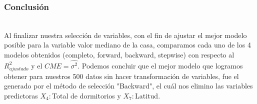 \documentclass[12pt]{beamer}
\begin{document}
\begin{frame}
\frametitle{Conclusión}
~\\ Al finalizar nuestra selección de variables, con el fin de ajustar el mejor modelo posible para la variable valor mediano de la casa, comparamos cada uno de los 4 modelos obtenidos (completo, forward, backward, stepwise) con respecto al $R^2_{ajustado}$ y el $CME=\hat{\sigma^2}$. Podemos concluir que el mejor modelo que logramos obtener  para nuestros 500 datos sin hacer transformación de variables, fue el generado por el método de selección "Backward", el cuál nos elimino las variables predictoras $X_{4}:$Total de dormitorios y $X_{7}:$Latitud.
\end{frame}
\end{document}
